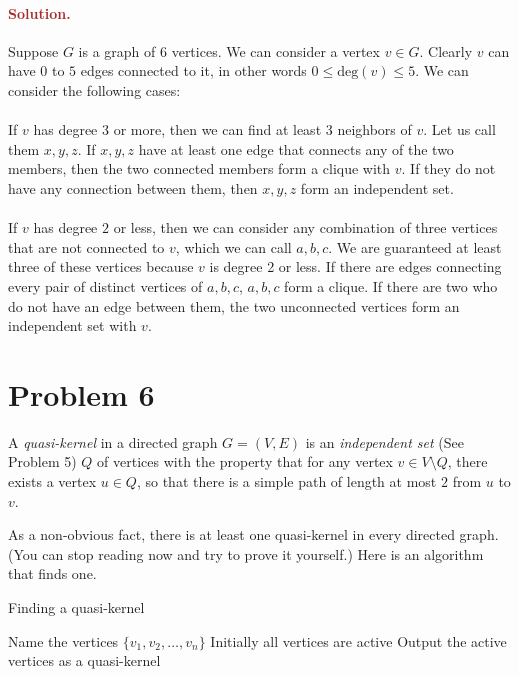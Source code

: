 \paragraph{\textcolor{brown}{Solution.}}
Suppose $G$ is a graph of $6$ vertices. We can consider a vertex $v \in G$. Clearly $v$ can have $0$ to $5$ edges connected to it, in other words $0 \leq \text{deg}(v) \leq 5$. We can consider the following cases:\\ \\
If $v$ has degree $3$ or more, then we can find at least 3 neighbors of $v$. Let us call them $x,y,z$. If $x,y,z$ have at least one edge that connects any of the two members, then the two connected members form a clique with $v$. If they do not have any connection between them, then $x,y,z$ form an independent set.\\ \\
If $v$ has degree $2$ or less, then we can consider any combination of three vertices that are not connected to $v$, which we can call $a,b,c$. We are guaranteed at least three of these vertices because $v$ is degree 2 or less. If there are edges connecting every pair of distinct vertices of $a,b,c$, $a,b,c$ form a clique. If there are two who do not have an edge between them, the two unconnected vertices form an independent set with $v$.


\section*{Problem 6}
A \emph{quasi-kernel} in a directed graph $G = (V, E)$ is an \emph{independent set} (See Problem 5) $Q$ of vertices with the property that for any vertex $v \in V \setminus Q$, there exists a vertex $u \in Q$, so that there is a simple path of length at most $2$ from $u$ to $v$.

As a non-obvious fact, there is at least one quasi-kernel in every directed graph. (You can stop reading now and try to prove it yourself.) Here is an algorithm that finds one.

\begin{algorithm}
\caption{Finding a quasi-kernel}
\label{alg:qk}
Name the vertices $\{v_1, v_2, \ldots, v_n\}$\;
Initially all vertices are active\;
Output the active vertices as a quasi-kernel\;
\end{algorithm}

